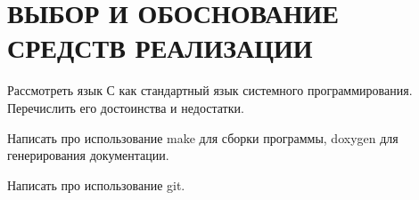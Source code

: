 \section[Выбор и обоснование средств реализации]{ВЫБОР И ОБОСНОВАНИЕ \\ СРЕДСТВ РЕАЛИЗАЦИИ}
\label{sec:choice}

Рассмотреть язык С как стандартный язык системного программирования.
Перечислить его достоинства и недостатки.

Написать про использование make для сборки программы, 
doxygen для генерирования документации. 

Написать про использование git.